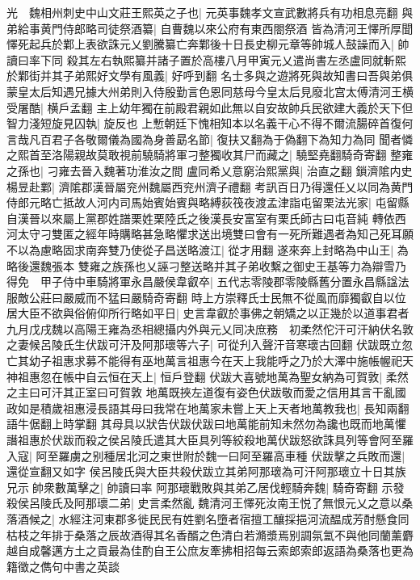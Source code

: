 光　魏相州刺史中山文莊王熙英之子也|{
	元英事魏孝文宣武數將兵有功相息亮翻}
與弟給事黄門侍郎略司徒祭酒纂|{
	自曹魏以來公府有東西閤祭酒}
皆為清河王懌所厚聞懌死起兵於鄴上表欲誅元乂劉騰纂亡奔鄴後十日長史柳元章等帥城人鼓譟而入|{
	帥讀曰率下同}
殺其左右執熙纂并諸子置於高樓八月甲寅元乂遣尚書左丞盧同就斬熙於鄴街并其子弟熙好文學有風義|{
	好呼到翻}
名士多與之遊將死與故知書曰吾與弟俱蒙皇太后知遇兄據大州弟則入侍殷勤言色恩同慈母今皇太后見廢北宫太傅清河王横受屠酷|{
	横戶孟翻}
主上幼年獨在前殿君親如此無以自安故帥兵民欲建大義於天下但智力淺短旋見囚執|{
	旋反也}
上慙朝廷下愧相知本以名義干心不得不爾流腸碎首復何言哉凡百君子各敬爾儀為國為身善勗名節|{
	復扶又翻為于偽翻下為知力為同}
聞者憐之熙首至洛陽親故莫敢視前驍騎將軍刁整獨收其尸而藏之|{
	驍堅堯翻騎奇寄翻}
整雍之孫也|{
	刁雍去晉入魏著功淮汝之間}
盧同希乂意窮治熙黨與|{
	治直之翻}
鎖濟隂内史楊昱赴鄴|{
	濟隂郡漢晉屬兖州魏屬西兖州濟子禮翻}
考訊百日乃得還任乂以同為黄門侍郎元略亡抵故人河内司馬始賓始賓與略縛荻筏夜渡孟津詣屯留栗法光家|{
	屯留縣自漢晉以來屬上黨郡姓譜栗姓栗陸氏之後漢長安富室有栗氏師古曰屯音純}
轉依西河太守刁雙匿之經年時購略甚急略懼求送出境雙曰會有一死所難遇者為知己死耳願不以為慮略固求南奔雙乃使從子昌送略渡江|{
	從才用翻}
遂來奔上封略為中山王|{
	為略後還魏張本}
雙雍之族孫也乂誣刁整送略并其子弟收繫之御史王基等力為辯雪乃得免　甲子侍中車騎將軍永昌嚴侯韋叡卒|{
	五代志零陵郡零陵縣舊分置永昌縣諡法服敵公莊曰嚴威而不猛曰嚴騎奇寄翻}
時上方崇釋氏士民無不從風而靡獨叡自以位居大臣不欲與俗俯仰所行略如平日|{
	史言韋叡於事佛之朝矯之以正幾於以道事君者}
九月戊戌魏以高陽王雍為丞相總攝内外與元乂同决庶務　初柔然佗汗可汗納伏名敦之妻候呂陵氏生伏跋可汗及阿那瓌等六子|{
	可從刋入聲汗音寒瓌古回翻}
伏跋既立忽亡其幼子祖惠求募不能得有巫地萬言祖惠今在天上我能呼之乃於大澤中施帳幄祀天神祖惠忽在帳中自云恒在天上|{
	恒戶登翻}
伏跋大喜號地萬為聖女納為可賀敦|{
	柔然之主曰可汗其正室曰可賀敦}
地萬既挾左道復有姿色伏跋敬而愛之信用其言干亂國政如是積歲祖惠浸長語其母曰我常在地萬家未嘗上天上天者地萬教我也|{
	長知兩翻語牛倨翻上時掌翻}
其母具以狀告伏跋伏跋曰地萬能前知未然勿為讒也既而地萬懼譖祖惠於伏跋而殺之侯呂陵氏遣其大臣具列等絞殺地萬伏跋怒欲誅具列等會阿至羅入寇|{
	阿至羅虜之别種居北河之東世附於魏一曰阿至羅高車種}
伏跋擊之兵敗而還|{
	還從宣翻又如字}
侯呂陵氏與大臣共殺伏跋立其弟阿那瓌為可汗阿那瓌立十日其族兄示帥衆數萬擊之|{
	帥讀曰率}
阿那瓌戰敗與其弟乙居伐輕騎奔魏|{
	騎奇寄翻}
示發殺侯呂陵氏及阿那瓌二弟|{
	史言柔然亂}
魏清河王懌死汝南王悦了無恨元乂之意以桑落酒候之|{
	水經注河東郡多徙民民有姓劉名墮者宿擅工釀採挹河流醖成芳酎懸食同枯枝之年排于桑落之辰故酒得其名香醑之色清白若滫漿焉别調氛氳不與他同蘭薰麝越自成馨邁方土之貢最為佳酌自王公庶友牽拂相招每云索郎索郎返語為桑落也更為籍徵之儁句中書之英談}
